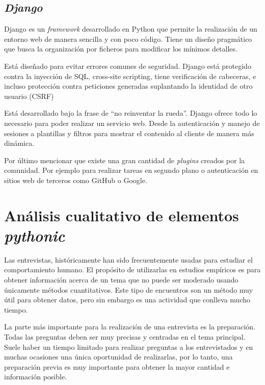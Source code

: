 \documentclass[a4paper, 12pt]{book}
\begin{document}
\section{\textit{Django}}
  
Django es un \textit{framework} desarrollado en Python que permite la realización de un entorno web de manera sencilla y con poco código. Tiene un diseño pragmático que busca la organización por ficheros para modificar los mínimos detalles.

Está diseñado para evitar errores comunes de seguridad. Django está protegido contra la inyección de SQL, cross-site scripting, tiene verificación de cabeceras, e incluso protección contra peticiones generadas suplantando la identidad de otro usuario (CSRF)

Está desarrollado bajo la frase de ``no reinventar la rueda''. Django ofrece todo lo necesario para poder realizar un servicio web. Desde la autenticación y manejo de sesiones a plantillas y filtros para mostrar el contenido al cliente de manera más dinámica.

Por último mencionar que existe una gran cantidad de \textit{plugins} creados por la comunidad. Por ejemplo para realizar tareas en segundo plano o autenticación en sitios web de terceros como GitHub o Google.




\cleardoublepage
\chapter{Análisis cualitativo de elementos \textit{pythonic}}
\label{chap:cualitativo}

Las entrevistas, históricamente han sido frecuentemente usadas para estudiar el comportamiento humano. El propósito de utilizarlas en estudios empíricos es para obtener información acerca de un tema que no puede ser moderado usando únicamente métodos cuantitativos. Este tipo de encuentros son un método muy útil para obtener datos, pero sin embargo es una actividad que conlleva mucho tiempo. 

La parte más importante para la realización de una entrevista es la preparación. Todas las preguntas deben ser muy precisas y centradas en el tema principal. Suele haber un tiempo limitado para realizar preguntas a los entrevistados y en muchas ocasiones una única oportunidad de realizarlas, por lo tanto, una preparación previa es muy importante para obtener la mayor cantidad e información posible.
\end{document}
